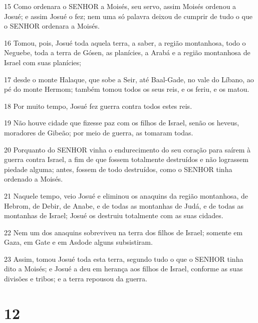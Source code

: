 \par 15 Como ordenara o SENHOR a Moisés, seu servo, assim Moisés ordenou a Josué; e assim Josué o fez; nem uma só palavra deixou de cumprir de tudo o que o SENHOR ordenara a Moisés.
\par 16 Tomou, pois, Josué toda aquela terra, a saber, a região montanhosa, todo o Neguebe, toda a terra de Gósen, as planícies, a Arabá e a região montanhosa de Israel com suas planícies;
\par 17 desde o monte Halaque, que sobe a Seir, até Baal-Gade, no vale do Líbano, ao pé do monte Hermom; também tomou todos os seus reis, e os feriu, e os matou.
\par 18 Por muito tempo, Josué fez guerra contra todos estes reis.
\par 19 Não houve cidade que fizesse paz com os filhos de Israel, senão os heveus, moradores de Gibeão; por meio de guerra, as tomaram todas.
\par 20 Porquanto do SENHOR vinha o endurecimento do seu coração para saírem à guerra contra Israel, a fim de que fossem totalmente destruídos e não lograssem piedade alguma; antes, fossem de todo destruídos, como o SENHOR tinha ordenado a Moisés.
\par 21 Naquele tempo, veio Josué e eliminou os anaquins da região montanhosa, de Hebrom, de Debir, de Anabe, e de todas as montanhas de Judá, e de todas as montanhas de Israel; Josué os destruiu totalmente com as suas cidades.
\par 22 Nem um dos anaquins sobreviveu na terra dos filhos de Israel; somente em Gaza, em Gate e em Asdode alguns subsistiram.
\par 23 Assim, tomou Josué toda esta terra, segundo tudo o que o SENHOR tinha dito a Moisés; e Josué a deu em herança aos filhos de Israel, conforme as suas divisões e tribos; e a terra repousou da guerra.

\chapter{12}

